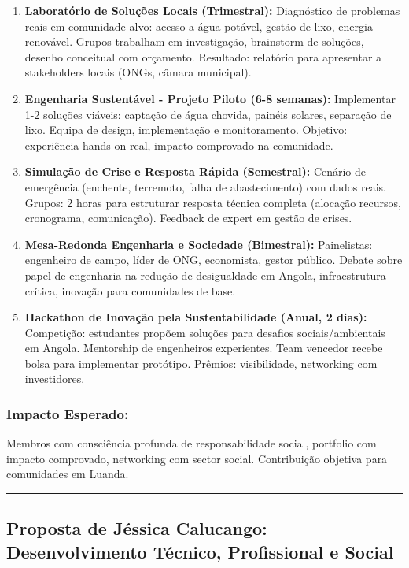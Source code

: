 \documentclass[12pt,a4paper]{article}
\begin{document}
\begin{enumerate}[itemsep=0.25cm]
    \item \textbf{Laboratório de Soluções Locais (Trimestral):} Diagnóstico de problemas reais em comunidade-alvo: acesso a água potável, gestão de lixo, energia renovável. Grupos trabalham em investigação, brainstorm de soluções, desenho conceitual com orçamento. Resultado: relatório para apresentar a stakeholders locais (ONGs, câmara municipal).
    
    \item \textbf{Engenharia Sustentável - Projeto Piloto (6-8 semanas):} Implementar 1-2 soluções viáveis: captação de água chovida, painéis solares, separação de lixo. Equipa de design, implementação e monitoramento. Objetivo: experiência hands-on real, impacto comprovado na comunidade.
    
    \item \textbf{Simulação de Crise e Resposta Rápida (Semestral):} Cenário de emergência (enchente, terremoto, falha de abastecimento) com dados reais. Grupos: 2 horas para estruturar resposta técnica completa (alocação recursos, cronograma, comunicação). Feedback de expert em gestão de crises.
    
    \item \textbf{Mesa-Redonda Engenharia e Sociedade (Bimestral):} Painelistas: engenheiro de campo, líder de ONG, economista, gestor público. Debate sobre papel de engenharia na redução de desigualdade em Angola, infraestrutura crítica, inovação para comunidades de base.
    
    \item \textbf{Hackathon de Inovação pela Sustentabilidade (Anual, 2 dias):} Competição: estudantes propõem soluções para desafios sociais/ambientais em Angola. Mentorship de engenheiros experientes. Team vencedor recebe bolsa para implementar protótipo. Prêmios: visibilidade, networking com investidores.
\end{enumerate}

\subsubsection*{Impacto Esperado:}
Membros com consciência profunda de responsabilidade social, portfolio com impacto comprovado, networking com sector social. Contribuição objetiva para comunidades em Luanda.

\textcolor{spe-secondary}{\hspace{0.5cm}\rule{0.4\linewidth}{0.8pt}}
\subsection{Proposta de Jéssica Calucango: Desenvolvimento Técnico, Profissional e Social}
\end{document}
